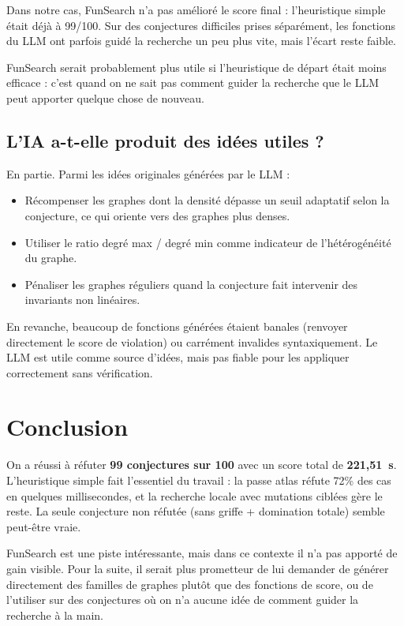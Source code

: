 \documentclass[12pt,a4paper]{article}
\begin{document}
Dans notre cas, FunSearch n'a pas amélioré le score final : l'heuristique
simple était déjà à 99/100.  Sur des conjectures difficiles prises séparément,
les fonctions du LLM ont parfois guidé la recherche un peu plus vite, mais
l'écart reste faible.

FunSearch serait probablement plus utile si l'heuristique de départ était moins
efficace : c'est quand on ne sait pas comment guider la recherche que le LLM
peut apporter quelque chose de nouveau.

\subsection{L'IA a-t-elle produit des idées utiles ?}

En partie.  Parmi les idées originales générées par le LLM :

\begin{itemize}
  \item Récompenser les graphes dont la densité dépasse un seuil adaptatif
        selon la conjecture, ce qui oriente vers des graphes plus denses.
  \item Utiliser le ratio degré max / degré min comme indicateur de
        l'hétérogénéité du graphe.
  \item Pénaliser les graphes réguliers quand la conjecture fait intervenir
        des invariants non linéaires.
\end{itemize}

En revanche, beaucoup de fonctions générées étaient banales (renvoyer directement
le score de violation) ou carrément invalides syntaxiquement.  Le LLM est utile
comme source d'idées, mais pas fiable pour les appliquer correctement sans
vérification.

\section*{Conclusion}

On a réussi à réfuter \textbf{99 conjectures sur 100} avec un score total de
\textbf{221,51~s}.  L'heuristique simple fait l'essentiel du travail : la passe
atlas réfute 72\% des cas en quelques millisecondes, et la recherche locale avec
mutations ciblées gère le reste.  La seule conjecture non réfutée (sans griffe +
domination totale) semble peut-être vraie.

FunSearch est une piste intéressante, mais dans ce contexte il n'a pas apporté
de gain visible.  Pour la suite, il serait plus prometteur de lui demander de
générer directement des familles de graphes plutôt que des fonctions de score,
ou de l'utiliser sur des conjectures où on n'a aucune idée de comment guider la
recherche à la main.
\end{document}
